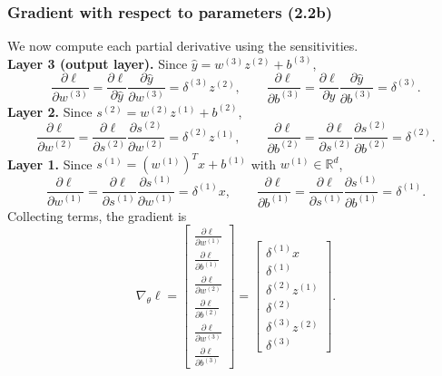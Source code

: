 \documentclass[11pt]{article}
\newcommand{\R}{\mathbb{R}}
\begin{document}
\subsubsection*{Gradient with respect to parameters (2.2b)}
We now compute each partial derivative using the sensitivities.
\\
\textbf{Layer 3 (output layer).}
Since $\hat{y}=w^{(3)}z^{(2)}+b^{(3)}$,
\[
\frac{\partial \ell}{\partial w^{(3)}} 
= \frac{\partial \ell}{\partial \hat{y}}\frac{\partial \hat{y}}{\partial w^{(3)}}
= \delta^{(3)} z^{(2)},
\qquad
\frac{\partial \ell}{\partial b^{(3)}}
= \frac{\partial \ell}{\partial \hat{y}}\frac{\partial \hat{y}}{\partial b^{(3)}}
= \delta^{(3)}.
\]
\textbf{Layer 2.}
Since $s^{(2)}=w^{(2)}z^{(1)}+b^{(2)}$,
\[
\frac{\partial \ell}{\partial w^{(2)}}
= \frac{\partial \ell}{\partial s^{(2)}}\frac{\partial s^{(2)}}{\partial w^{(2)}}
= \delta^{(2)} z^{(1)},
\qquad
\frac{\partial \ell}{\partial b^{(2)}}
= \frac{\partial \ell}{\partial s^{(2)}}\frac{\partial s^{(2)}}{\partial b^{(2)}}
= \delta^{(2)}.
\]
\textbf{Layer 1.}
Since $s^{(1)}=(w^{(1)})^T x + b^{(1)}$ with $w^{(1)}\in\R^d$,
\[
\frac{\partial \ell}{\partial w^{(1)}}
= \frac{\partial \ell}{\partial s^{(1)}}\frac{\partial s^{(1)}}{\partial w^{(1)}}
= \delta^{(1)} x,
\qquad
\frac{\partial \ell}{\partial b^{(1)}}
= \frac{\partial \ell}{\partial s^{(1)}}\frac{\partial s^{(1)}}{\partial b^{(1)}}
= \delta^{(1)}.
\]
Collecting terms, the gradient is
\[
\boxed{
\nabla_\theta \ell
=
\begin{bmatrix}
\frac{\partial \ell}{\partial w^{(1)}}\\[0.25em]
\frac{\partial \ell}{\partial b^{(1)}}\\[0.25em]
\frac{\partial \ell}{\partial w^{(2)}}\\[0.25em]
\frac{\partial \ell}{\partial b^{(2)}}\\[0.25em]
\frac{\partial \ell}{\partial w^{(3)}}\\[0.25em]
\frac{\partial \ell}{\partial b^{(3)}}
\end{bmatrix}
=
\begin{bmatrix}
\delta^{(1)}x\\
\delta^{(1)}\\
\delta^{(2)}z^{(1)}\\
\delta^{(2)}\\
\delta^{(3)}z^{(2)}\\
\delta^{(3)}
\end{bmatrix}.
}
\]
\end{document}
